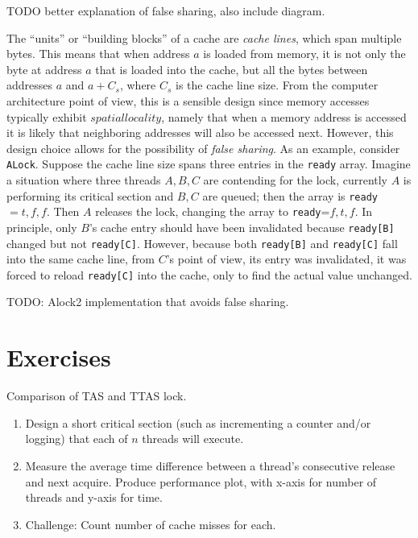 TODO better explanation of false sharing, also include diagram.
\begin{definition}
    The ``units'' or ``building blocks'' of a cache are \textit{cache lines}, which span multiple bytes. This means that when address $a$ is loaded from memory, it is not only the byte at address $a$ that is loaded into the cache, but all the bytes between addresses $a$ and $a+C_s$, where $C_s$ is the cache line size. From the computer architecture point of view, this is a sensible design since memory accesses typically exhibit $spatial locality$, namely that when a memory address is accessed it is likely that neighboring addresses will also be accessed next. However, this design choice allows for the possibility of \textit{false sharing}. As an example, consider \verb|ALock|. Suppose the cache line size spans three entries in the \verb|ready| array. Imagine a situation where three threads $A,B,C$ are contending for the lock, currently $A$ is performing its critical section and $B,C$ are queued; then the array is \verb|ready|$={t,f,f}$. Then $A$ releases the lock, changing the array to \verb|ready|=${f,t,f}$. In principle, only $B$'s cache entry should have been invalidated because \verb|ready[B]| changed but not \verb|ready[C]|. However, because both \verb|ready[B]| and \verb|ready[C]| fall into the same cache line, from $C$'s point of view, its entry was invalidated, it was forced to reload \verb|ready[C]| into the cache, only to find the actual value unchanged.
\end{definition}

TODO: Alock2 implementation that avoids false sharing.

\section{Exercises}
\begin{exercise}
    Comparison of TAS and TTAS lock.
    \begin{enumerate}
        \item Design a short critical section (such as incrementing a counter and/or logging) that each of $n$ threads will execute.
        \item Measure the average time difference between a thread's consecutive release and next acquire. Produce performance plot, with x-axis for number of threads and y-axis for time.
        \item Challenge: Count number of cache misses for each.
    \end{enumerate}
\end{exercise}

